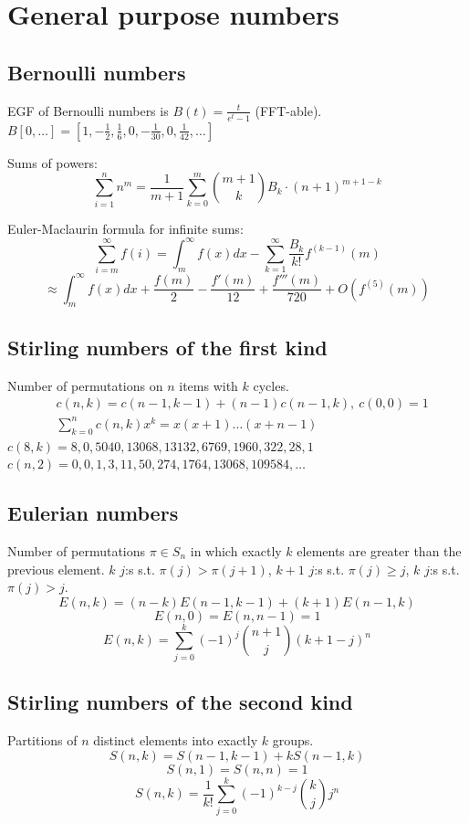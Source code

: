 \section{General purpose numbers}
	\subsection{Bernoulli numbers}
		EGF of Bernoulli numbers is $B(t)=\frac{t}{e^t-1}$ (FFT-able).
		$B[0,\ldots] = [1, -\frac{1}{2}, \frac{1}{6}, 0, -\frac{1}{30}, 0, \frac{1}{42}, \ldots]$

		Sums of powers:
		\small
		\[ \sum_{i=1}^n n^m = \frac{1}{m+1} \sum_{k=0}^m \binom{m+1}{k} B_k \cdot (n+1)^{m+1-k} \]
		\normalsize

		Euler-Maclaurin formula for infinite sums:
		\small
		\[ \sum_{i=m}^{\infty} f(i) = \int_m^\infty f(x) dx - \sum_{k=1}^\infty \frac{B_k}{k!}f^{(k-1)}(m) \]
		\[ \approx \int_{m}^\infty f(x)dx + \frac{f(m)}{2} - \frac{f'(m)}{12} + \frac{f'''(m)}{720} + O(f^{(5)}(m)) \]
		\normalsize

	\subsection{Stirling numbers of the first kind}
		Number of permutations on $n$ items with $k$ cycles.
		\begin{align*}
			&c(n,k) = c(n-1,k-1) + (n-1) c(n-1,k),\ c(0,0) = 1 \\
			&\textstyle \sum_{k=0}^n c(n,k)x^k = x(x+1) \dots (x+n-1)
		\end{align*}
		$c(8,k) = 8, 0, 5040, 13068, 13132, 6769, 1960, 322, 28, 1$ \\
		$c(n,2) = 0, 0, 1, 3, 11, 50, 274, 1764, 13068, 109584, \dots$

	\subsection{Eulerian numbers}
		Number of permutations $\pi \in S_n$ in which exactly $k$ elements are greater than the previous element. $k$ $j$:s s.t. $\pi(j)>\pi(j+1)$, $k+1$ $j$:s s.t. $\pi(j)\geq j$, $k$ $j$:s s.t. $\pi(j)>j$.
		$$E(n,k) = (n-k)E(n-1,k-1) + (k+1)E(n-1,k)$$
		$$E(n,0) = E(n,n-1) = 1$$
		$$E(n,k) = \sum_{j=0}^k(-1)^j\binom{n+1}{j}(k+1-j)^n$$

	\subsection{Stirling numbers of the second kind}
		Partitions of $n$ distinct elements into exactly $k$ groups.
		$$S(n,k) = S(n-1,k-1) + k S(n-1,k)$$
		$$S(n,1) = S(n,n) = 1$$
		$$S(n,k) = \frac{1}{k!}\sum_{j=0}^k (-1)^{k-j}\binom{k}{j}j^n$$

